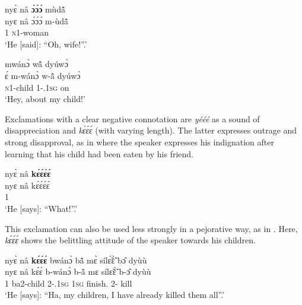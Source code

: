 \ea \label{ooo}
  \glll  nyɛ̀ nâ {\bfseries ɔ́ɔ́ɔ́} mùdã̂ \\
          nyɛ nâ ɔ́ɔ́ɔ́ m-ùdã̂ \\
            1 {\COMP} {\EXCL} \textsc{n}1-woman  \\
    \trans `He [said]: ``Oh, wife!''.'
\z

\ea \label{eee}
   mwánɔ̀ wã̂ dyúwɔ̀ \\
       ɛ́ m-wánɔ̀ w-ã̂ dyúwɔ̀ \\
        {\EXCL} \textsc{n}1-child 1-{\POSS}.1\textsc{sg} on \\
    \trans `Hey, about my child!'
\z

Exclamations with a clear negative connotation are {\itshape yééé} as a sound of disappreciation and {\itshape kɛ́ɛ́ɛ́} (with varying length). The latter expresses outrage and strong disapproval, as in  where the speaker expresses his indignation after learning that his child had been eaten by his friend.

\ea \label{keee1}
  \glll nyɛ̀ nâ {\bfseries kɛ́ɛ́ɛ́ɛ́} \\
        nyɛ nâ kɛ́ɛ́ɛ́ɛ́ \\
       1 {\COMP} {\EXCL}  \\
    \trans `He [says]: ``What!''.'
\z

This exclamation can also be used less strongly in a pejorative way, as in . Here, {\itshape kɛ́ɛ́ɛ́} shows the belittling attitude of the speaker towards his children.

\ea \label{keee2}
  \glll  nyɛ̀ nâ {\bfseries kɛ́ɛ́ɛ́} bwánɔ̀ bã̂ mɛ̀ sílɛ̃́ɛ̃̀ bɔ̂ dyùù \\
        nyɛ nâ kɛ́ɛ̀ b-wánɔ̀ b-ã̊ mɛ sílɛ̃ɛ̃̀ b-ɔ̂ dyùù \\
        1 {\COMP} {\EXCL} ba2-child 2-{\POSS}.1\textsc{sg} 1\textsc{sg} finish.{\COMPL} 2-{\OBJ} kill \\
    \trans `He [says]: ``Ha, my children, I have already killed them all''.'
\z





